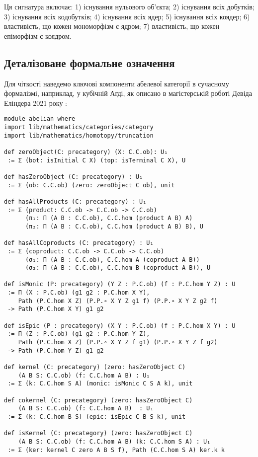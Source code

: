 \documentclass{article}
\begin{document}
Ця сигнатура включає: 1) існування нульового об’єкта; 2) існування всіх добутків; 3) існування всіх кодобутків; 4) існування всіх ядер; 5) існування всіх коядер; 6) властивість, що кожен мономорфізм є ядром; 7) властивість, що кожен епіморфізм є коядром.

\subsection{Деталізоване формальне означення}
Для чіткості наведемо ключові компоненти абелевої категорії в сучасному формалізмі, наприклад, у кубічній Агді, як описано в магістерській роботі Девіда Еліндера 2021 року \cite{Elinder21}:

\begin{lstlisting}
module abelian where
import lib/mathematics/categories/category
import lib/mathematics/homotopy/truncation

def zeroObject(C: precategory) (X: C.C.ob): U₁
 := Σ (bot: isInitial C X) (top: isTerminal C X), U

def hasZeroObject (C: precategory) : U₁
 := Σ (ob: C.C.ob) (zero: zeroObject C ob), unit

def hasAllProducts (C: precategory) : U₁
 := Σ (product: C.C.ob -> C.C.ob -> C.C.ob)
      (π₁: Π (A B : C.C.ob), C.C.hom (product A B) A)
      (π₂: Π (A B : C.C.ob), C.C.hom (product A B) B), U

def hasAllCoproducts (C: precategory) : U₁
 := Σ (coproduct: C.C.ob -> C.C.ob -> C.C.ob)
      (σ₁: Π (A B : C.C.ob), C.C.hom A (coproduct A B))
      (σ₂: Π (A B : C.C.ob), C.C.hom B (coproduct A B)), U

def isMonic (P: precategory) (Y Z : P.C.ob) (f : P.C.hom Y Z) : U
 := Π (X : P.C.ob) (g1 g2 : P.C.hom X Y),
    Path (P.C.hom X Z) (P.P.∘ X Y Z g1 f) (P.P.∘ X Y Z g2 f)
 -> Path (P.C.hom X Y) g1 g2

def isEpic (P : precategory) (X Y : P.C.ob) (f : P.C.hom X Y) : U
 := Π (Z : P.C.ob) (g1 g2 : P.C.hom Y Z),
    Path (P.C.hom X Z) (P.P.∘ X Y Z f g1) (P.P.∘ X Y Z f g2)
 -> Path (P.C.hom Y Z) g1 g2

def kernel (C: precategory) (zero: hasZeroObject C)
    (A B S: C.C.ob) (f: C.C.hom A B) : U₁
 := Σ (k: C.C.hom S A) (monic: isMonic C S A k), unit

def cokernel (C: precategory) (zero: hasZeroObject C)
    (A B S: C.C.ob) (f: C.C.hom A B)  : U₁
 := Σ (k: C.C.hom B S) (epic: isEpic C B S k), unit

def isKernel (C: precategory) (zero: hasZeroObject C)
    (A B S: C.C.ob) (f: C.C.hom A B) (k: C.C.hom S A) : U₁
 := Σ (ker: kernel C zero A B S f), Path (C.C.hom S A) ker.k k


\end{lstlisting}
\end{document}
